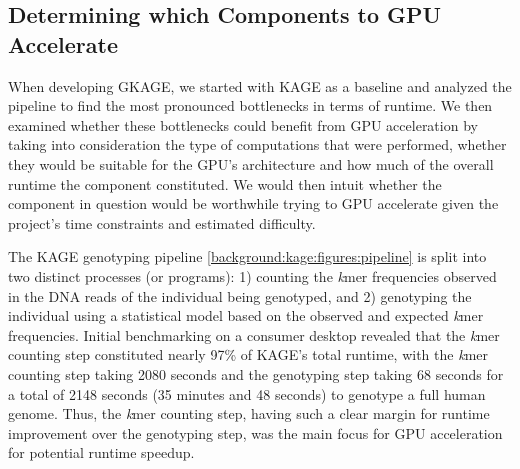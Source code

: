 \subsection{Determining which Components to GPU Accelerate} \label{methods:determining_which_components_to_gpu_accelerate}

When developing GKAGE, we started with KAGE as a baseline and analyzed the pipeline to find the most pronounced bottlenecks in terms of runtime.
We then examined whether these bottlenecks could benefit from GPU acceleration by taking into consideration the type of computations that were performed, whether they would be suitable for the GPU's architecture and how much of the overall runtime the component constituted. 
We would then intuit whether the component in question would be worthwhile trying to GPU accelerate given the project's time constraints and estimated difficulty.

The KAGE genotyping pipeline \ref{background:kage:figures:pipeline} is split into two distinct processes (or programs): 1) counting the \textit{k}mer frequencies observed in the DNA reads of the individual being genotyped, and 2) genotyping the individual using a statistical model based on the observed and expected \textit{k}mer frequencies.
Initial benchmarking on a consumer desktop revealed that the \textit{k}mer counting step constituted nearly 97\% of KAGE's total runtime, with the \textit{k}mer counting step taking 2080 seconds and the genotyping step taking 68 seconds for a total of 2148 seconds (35 minutes and 48 seconds) to genotype a full human genome.
Thus, the \textit{k}mer counting step, having such a clear margin for runtime improvement over the genotyping step, was the main focus for GPU acceleration for potential runtime speedup.
